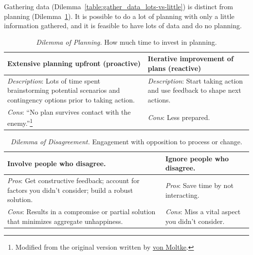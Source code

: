 Gathering data (Dilemma~\ref{table:gather_data_lots-vs-little}) is distinct from planning (Dilemma~\ref{table:planning}). It is possible to do a lot of planning with only a little information gathered, and it is feasible to have lots of data and do no planning. 

\begin{center}
\begin{table}[H] %
\begin{tabular}{ | m{\dilemmatablewidth}| m{\dilemmatablewidth} | } 
  \hline
  \textbf{Extensive planning upfront (proactive)} & 
  \textbf{Iterative improvement of plans (reactive)} \\ 
  \hline
  \textit{Description}: Lots of time spent brainstorming potential scenarios and contingency options prior to taking action. & 
  \textit{Description}: Start taking action and use feedback to shape next actions. \\ 
  \hline
  \textit{Cons}: ``No plan survives contact with the enemy.''\footnote{Modified from the original version written by \href{https://en.wikipedia.org/wiki/Helmuth_von_Moltke_the_Elder}{von Moltke}.} & 
  \textit{Cons}: Less prepared. \\  
  \hline
\end{tabular}
\caption{\textit{Dilemma of Planning.}
How much time to invest in planning.
}
\label{table:planning}
\end{table}
\end{center}



\begin{center}
\begin{table}[H]
\begin{tabular}{ | m{\dilemmatablewidth}| m{\dilemmatablewidth} | } 
  \hline
  \textbf{Involve people who disagree.} & 
  \textbf{Ignore people who disagree.} \\ 
  \hline
  \textit{Pros}: Get constructive feedback; account for factors you didn't consider; build a robust solution. & 
  \textit{Pros}: Save time by not interacting. \\  
  \hline
  \textit{Cons}: Results in a compromise or partial solution that minimizes aggregate unhappiness. & 
  \textit{Cons}: Miss a vital aspect you didn't consider. \\  
  \hline
\end{tabular}
\caption{\textit{Dilemma of Disagreement.}
Engagement with opposition to process or change.
}
\label{table:opposition}
\end{table}
\end{center}

